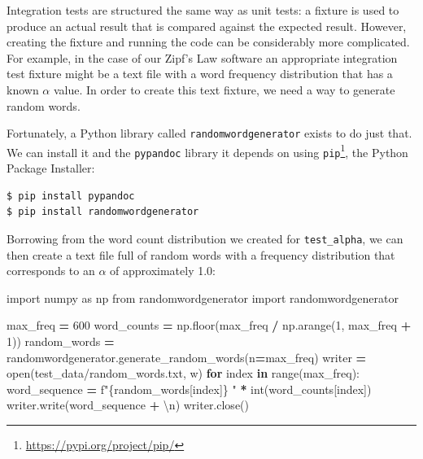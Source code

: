 \documentclass[
]{krantz}
\makeatletter
\newenvironment{Shaded}{\begin{snugshade}}{\end{snugshade}}
\newcommand{\BuiltInTok}[1]{#1}
\newcommand{\CharTok}[1]{\textcolor[rgb]{0.31,0.60,0.02}{#1}}
\newcommand{\ControlFlowTok}[1]{\textcolor[rgb]{0.13,0.29,0.53}{\textbf{#1}}}
\newcommand{\DecValTok}[1]{\textcolor[rgb]{0.00,0.00,0.81}{#1}}
\newcommand{\ImportTok}[1]{#1}
\newcommand{\KeywordTok}[1]{\textcolor[rgb]{0.13,0.29,0.53}{\textbf{#1}}}
\newcommand{\NormalTok}[1]{#1}
\newcommand{\OperatorTok}[1]{\textcolor[rgb]{0.81,0.36,0.00}{\textbf{#1}}}
\newcommand{\SpecialCharTok}[1]{\textcolor[rgb]{0.00,0.00,0.00}{#1}}
\newcommand{\SpecialStringTok}[1]{\textcolor[rgb]{0.31,0.60,0.02}{#1}}
\newcommand{\StringTok}[1]{\textcolor[rgb]{0.31,0.60,0.02}{#1}}
\renewcommand{\href}[2]{#2\footnote{\url{#1}}}
\newenvironment{kframe}{%
\medskip{}
\setlength{\fboxsep}{.8em}
 \def\at@end@of@kframe{}%
 \ifinner\ifhmode%
  \def\at@end@of@kframe{\end{minipage}}%
  \begin{minipage}{\columnwidth}%
 \fi\fi%
 \def\FrameCommand##1{\hskip\@totalleftmargin \hskip-\fboxsep
 \colorbox{shadecolor}{##1}\hskip-\fboxsep
     \hskip-\linewidth \hskip-\@totalleftmargin \hskip\columnwidth}%
 \MakeFramed {\advance\hsize-\width
   \@totalleftmargin\z@ \linewidth\hsize
   \@setminipage}}%
 {\par\unskip\endMakeFramed%
 \at@end@of@kframe}
\renewenvironment{Shaded}{\begin{kframe}}{\end{kframe}}
\makeatother
\begin{document}
Integration tests are structured the same way as unit tests:
a fixture is used to produce an actual result
that is compared against the expected result.
However,
creating the fixture and running the code
can be considerably more complicated.
For example,
in the case of our Zipf's Law software an appropriate integration test fixture
might be a text file with a word frequency distribution that has a known \(\alpha\) value.
In order to create this text fixture,
we need a way to generate random words.

Fortunately, a Python library called \texttt{randomwordgenerator} exists to do just that.
We can install it and the \texttt{pypandoc} library it depends on
using \href{https://pypi.org/project/pip/}{\texttt{pip}}, the Python Package Installer:

\begin{verbatim}
$ pip install pypandoc
$ pip install randomwordgenerator
\end{verbatim}

Borrowing from the word count distribution we created for \texttt{test\_alpha},
we can then create a text file full of random words
with a frequency distribution that corresponds to an \(\alpha\) of approximately 1.0:

\begin{Shaded}
\begin{Highlighting}[]
\ImportTok{import}\NormalTok{ numpy }\ImportTok{as}\NormalTok{ np}
\ImportTok{from}\NormalTok{ randomwordgenerator }\ImportTok{import}\NormalTok{ randomwordgenerator}

\NormalTok{max\_freq }\OperatorTok{=} \DecValTok{600}
\NormalTok{word\_counts }\OperatorTok{=}\NormalTok{ np.floor(max\_freq }\OperatorTok{/}\NormalTok{ np.arange(}\DecValTok{1}\NormalTok{, max\_freq }\OperatorTok{+} \DecValTok{1}\NormalTok{))}
\NormalTok{random\_words }\OperatorTok{=}\NormalTok{ randomwordgenerator.generate\_random\_words(n}\OperatorTok{=}\NormalTok{max\_freq)}
\NormalTok{writer }\OperatorTok{=} \BuiltInTok{open}\NormalTok{(}\StringTok{\textquotesingle{}test\_data/random\_words.txt\textquotesingle{}}\NormalTok{, }\StringTok{\textquotesingle{}w\textquotesingle{}}\NormalTok{)}
\ControlFlowTok{for}\NormalTok{ index }\KeywordTok{in} \BuiltInTok{range}\NormalTok{(max\_freq):}
\NormalTok{    word\_sequence }\OperatorTok{=} \SpecialStringTok{f"}\SpecialCharTok{\{}\NormalTok{random\_words[index]}\SpecialCharTok{\}}\SpecialStringTok{ "} \OperatorTok{*} \BuiltInTok{int}\NormalTok{(word\_counts[index])}
\NormalTok{    writer.write(word\_sequence }\OperatorTok{+} \StringTok{\textquotesingle{}}\CharTok{\textbackslash{}n}\StringTok{\textquotesingle{}}\NormalTok{)}
\NormalTok{writer.close()}
\end{Highlighting}
\end{Shaded}
\end{document}
